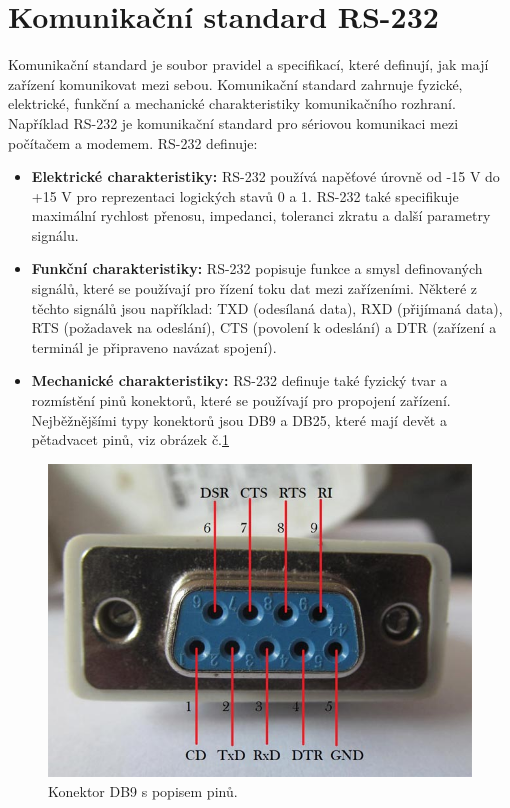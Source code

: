 \section{Komunikační standard RS-232}
Komunikační standard je soubor pravidel a specifikací, které definují, jak mají zařízení komunikovat mezi sebou. Komunikační standard zahrnuje fyzické, elektrické, funkční a mechanické charakteristiky komunikačního rozhraní. Například RS-232 je komunikační standard pro sériovou komunikaci mezi počítačem a modemem.
RS-232 definuje:
\begin{itemize}
    \item \textbf{Elektrické charakteristiky:} RS-232 používá napěťové úrovně od -15 V do +15 V pro reprezentaci logických stavů 0 a 1. RS-232 také specifikuje maximální rychlost přenosu, impedanci, toleranci zkratu a další parametry signálu.
    \item \textbf{Funkční charakteristiky:} RS-232 popisuje funkce a smysl definovaných signálů, které se používají pro řízení toku dat mezi zařízeními. Některé z těchto signálů jsou například: TXD (odesílaná data), RXD (přijímaná data), RTS (požadavek na odeslání), CTS (povolení k odeslání) a DTR (zařízení a terminál je připraveno navázat spojení). %
    \item \textbf{Mechanické charakteristiky:} RS-232 definuje také fyzický tvar a rozmístění pinů konektorů, které se používají pro propojení zařízení. Nejběžnějšími typy konektorů jsou DB9 a DB25, které mají devět a pětadvacet pinů, viz obrázek č.\ref{rs232_obr} \cite{ser kom}
\end{itemize}

\begin{figure}[!h]
    \begin{center}
        \includegraphics[scale=0.4]{obrazky/RS232.jpeg}
    \end{center}
    \caption{Konektor DB9 s popisem pinů. \cite{RS232}}
    \label{rs232_obr}
\end{figure}

